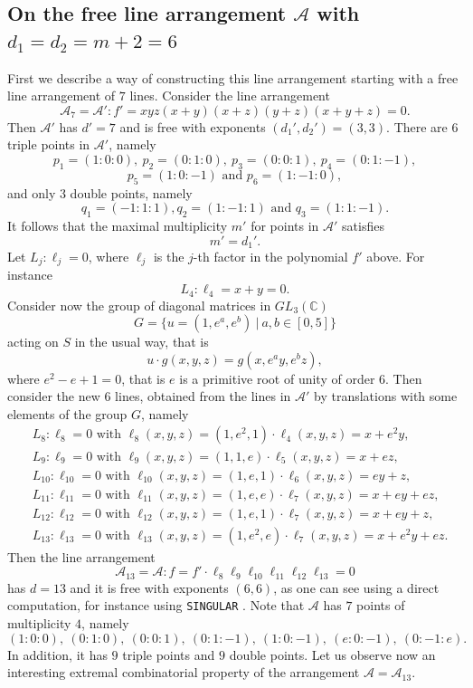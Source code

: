 \documentclass[12pt]{amsart}
\theoremstyle{plain}
\theoremstyle{definition}
\numberwithin{equation}{section}
\newcommand{\A}{{\mathcal A}}
\newcommand{\C}{\mathbb{C}}
\begin{document}
\subsection{On the free line arrangement $\A$ with $d_1=d_2=m+2=6$} 
First we describe a way of constructing this line arrangement starting with a free line arrangement of $7$ lines.
Consider the line arrangement
$$\A_7=\A': f'=xyz(x+y)(x+z)(y+z)(x+y+z)=0.$$
Then $\A'$ has $d'=7$ and is free with exponents $(d_1',d_2')=(3,3)$.
There are 6 triple points in $\A'$, namely
$$p_1=(1:0:0), \ p_2=(0:1:0), \ p_3=(0:0:1), \ p_4=(0:1:-1),$$
 $$ p_5 =(1:0:-1) \text{ and }
 p_6=(1:-1:0),$$
 and only 3 double points, namely 
 $$q_1=(-1:1:1), q_2= (1:-1:1) \text{ and } q_3=(1:1:-1).$$
 It follows that the maximal multiplicity $m'$ for points in $\A'$ satisfies $$m'=d_1'.$$
Let $L_j :\ell_j=0$, where $\ell_j$ is the $j$-th factor in the polynomial $f'$ above. For instance
$$L_4: \ell_4=x+y=0.$$
Consider now the group of diagonal matrices in $GL_3(\C)$
$$G=\{u=(1,e^a, e^b) \  |  \ a,b \in [0,5] \}$$
acting on $S$ in the usual way, that is
$$u\cdot g(x,y,z)=g(x,e^ay,e^bz),$$
where $e^2-e+1=0$, that is $e$ is a primitive root of unity of order 6.
Then consider the new 6 lines, obtained from the lines in $\A'$ by translations with some elements of the group $G$, namely
\begin{align*}
&L_8: \ell_8=0 \text{ with } \ell_8(x,y,z)=(1,e^2,1)\cdot \ell_4(x,y,z)=x+e^2y,\\
&L_9: \ell_9=0 \text{ with } \ell_9(x,y,z)=(1,1,e)\cdot \ell_5(x,y,z)=x+ez,\\
&L_{10}: \ell_{10}=0 \text{ with } \ell_{10}(x,y,z)=(1,e,1)\cdot \ell_6(x,y,z)=ey+z,\\
&L_{11}: \ell_{11}=0 \text{ with } \ell_{11}(x,y,z)=(1,e,e)\cdot \ell_7(x,y,z)=x+ey+ez,\\
&L_{12}: \ell_{12}=0 \text{ with } \ell_{12}(x,y,z)=(1,e,1)\cdot \ell_7(x,y,z)=x+ey+z,\\
&L_{13}:\ell_{13}=0 \text{ with } \ell_{13}(x,y,z)=(1,e^2,e)\cdot \ell_7(x,y,z)=x+e^2y+ez.
\end{align*}
Then the line arrangement
$$\A_{13}=\A:f=f' \cdot \ell_8\ell_9\ell_{10}\ell_{11}\ell_{12}\ell_{13}=0
$$
has $d=13$ and it is free with exponents $(6,6)$, as one can see using a direct computation, for instance using \verb}SINGULAR} \cite{Sing}. 
Note that $\A$ has $7$ points of multiplicity $4$, namely
$$(1:0:0), \ (0:1:0), \ (0:0:1), \ (0:1:-1), \ (1:0:-1), \ (e:0:-1), \ (0:-1:e).$$
In addition, it has $9$ triple points and $9$ double points. Let us observe now an interesting extremal combinatorial property of the arrangement $\A=\A_{13}$.
\end{document}
